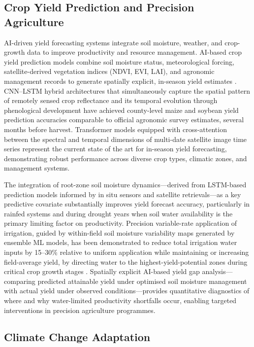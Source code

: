 \documentclass[land,article,submit,pdftex,moreauthors]{Definitions/mdpi}
\numberwithin{equation}{section}
\begin{document}
\subsection{Crop Yield Prediction and Precision Agriculture}

AI-driven yield forecasting systems integrate soil moisture, weather, and crop-growth data to improve productivity and resource management. AI-based crop yield prediction models combine soil moisture status, meteorological forcing, satellite-derived vegetation indices (NDVI, EVI, LAI), and agronomic management records to generate spatially explicit, in-season yield estimates \citep{you2017deep}. CNN--LSTM hybrid architectures that simultaneously capture the spatial pattern of remotely sensed crop reflectance and its temporal evolution through phenological development have achieved county-level maize and soybean yield prediction accuracies comparable to official agronomic survey estimates, several months before harvest. Transformer models equipped with cross-attention between the spectral and temporal dimensions of multi-date satellite image time series represent the current state of the art for in-season yield forecasting, demonstrating robust performance across diverse crop types, climatic zones, and management systems.

The integration of root-zone soil moisture dynamics---derived from LSTM-based prediction models informed by in situ sensors and satellite retrievals---as a key predictive covariate substantially improves yield forecast accuracy, particularly in rainfed systems and during drought years when soil water availability is the primary limiting factor on productivity. Precision variable-rate application of irrigation, guided by within-field soil moisture variability maps generated by ensemble ML models, has been demonstrated to reduce total irrigation water inputs by 15--30\% relative to uniform application while maintaining or increasing field-average yield, by directing water to the highest-yield-potential zones during critical crop growth stages \citep{vij2020iot}. Spatially explicit AI-based yield gap analysis---comparing predicted attainable yield under optimised soil moisture management with actual yield under observed conditions---provides quantitative diagnostics of where and why water-limited productivity shortfalls occur, enabling targeted interventions in precision agriculture programmes.

\subsection{Climate Change Adaptation}
\end{document}
